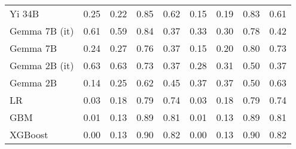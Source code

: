 \begin{tabular}{lllllllll}
Yi 34B & 0.25 & \cellcolor{cyan!2.5} 0.22 & \cellcolor{cyan!13.3} 0.85 & 0.62 & 0.15 & 0.19 & \cellcolor{cyan!17.7} 0.83 & 0.61 \\
Gemma 7B (it) & \cellcolor{orange!14.7} 0.61 & \cellcolor{orange!4.7} 0.59 & \cellcolor{cyan!3.8} 0.84 & \cellcolor{orange!25.0} 0.37 & 0.33 & 0.30 & 0.78 & 0.42 \\
Gemma 7B & 0.24 & 0.27 & 0.76 & \cellcolor{orange!25.0} 0.37 & 0.15 & 0.20 & 0.80 & 0.73 \\
Gemma 2B (it) & \cellcolor{orange!25.0} 0.63 & \cellcolor{orange!25.0} 0.63 & 0.73 & \cellcolor{orange!25.0} 0.37 & 0.28 & 0.31 & \cellcolor{orange!25.0} 0.50 & \cellcolor{orange!25.0} 0.37 \\
Gemma 2B & \cellcolor{cyan!25.0} 0.14 & 0.25 & \cellcolor{orange!25.0} 0.62 & 0.45 & \cellcolor{orange!25.0} 0.37 & \cellcolor{orange!25.0} 0.37 & \cellcolor{orange!25.0} 0.50 & 0.63 \\
LR & 0.03 & 0.18 & 0.79 & 0.74 & 0.03 & 0.18 & 0.79 & 0.74 \\
GBM & 0.01 & 0.13 & 0.89 & 0.81 & 0.01 & 0.13 & 0.89 & 0.81 \\
XGBoost & 0.00 & 0.13 & 0.90 & 0.82 & 0.00 & 0.13 & 0.90 & 0.82 \\
\bottomrule
\end{tabular}

